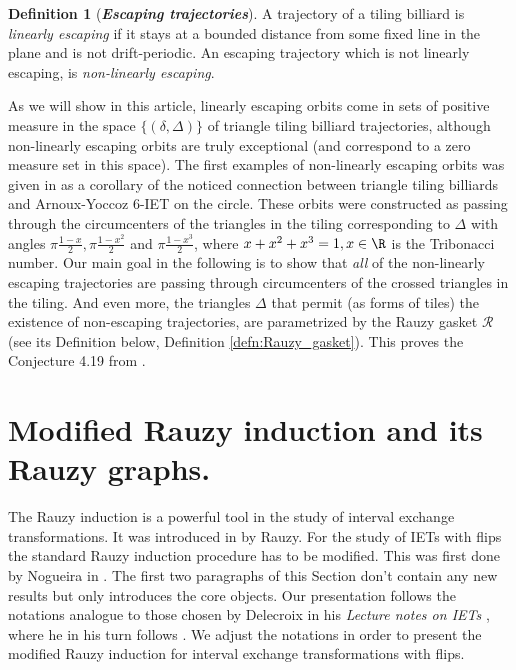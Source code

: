\documentclass[12pt]{article}
\theoremstyle{definition}
\newtheorem{definition}{Definition}
\begin{document}
\begin{definition}[\emph{\textbf{Escaping trajectories}}]
A trajectory of a tiling billiard is \emph{linearly escaping} if it stays at a bounded distance from some fixed line in the plane and is not drift-periodic. An escaping trajectory which is not linearly escaping, is \emph{non-linearly escaping}. 
\end{definition}

As we will show in this article, linearly escaping orbits come in sets of positive measure in the space $\{(\delta, \Delta)\}$ of triangle tiling billiard trajectories,  although non-linearly escaping orbits are truly exceptional (and correspond to a zero measure set in this space). The first examples of non-linearly escaping orbits was given in \cite{BDFI18} as a corollary of the noticed connection between triangle tiling billiards and Arnoux-Yoccoz $6$-IET on the circle. These orbits were constructed as passing through the circumcenters of the triangles in the tiling corresponding to $\Delta$ with angles $\pi \frac{1-x}{2}, \pi \frac{1-x^2}{2}$ and $\pi \frac{1-x^3}{2}$, where $x+x^2+x^3=1, x \in \R$ is the Tribonacci number. Our main goal in the following is to show that\emph{ all} of the non-linearly escaping trajectories are passing through circumcenters of the crossed triangles in the tiling. And even more, the triangles $\Delta$ that permit (as forms of tiles) the existence of non-escaping trajectories, are parametrized by the Rauzy gasket $\boldsymbol{\mathcal{R}}$(see its Definition below, Definition \ref{defn:Rauzy_gasket}). This proves the Conjecture 4.19 from \cite{BDFI18}.

\section{Modified Rauzy induction and its Rauzy graphs.}\label{sec: modified Rauzy}
The Rauzy induction is a powerful tool in the study of interval exchange transformations. It was introduced in \cite{R79} by Rauzy. For the study of IETs with flips the standard Rauzy induction procedure has to be modified. This was first done by Nogueira in \cite{N89}. The first two paragraphs of this Section don't contain any new results but only introduces the core objects. Our presentation follows the notations analogue to those chosen by Delecroix in his \emph{Lecture notes on IETs} \cite{D16}, where he in his turn follows \cite{MMY10}. We adjust the notations in order to present the modified Rauzy induction for interval exchange transformations with flips.
\end{document}
